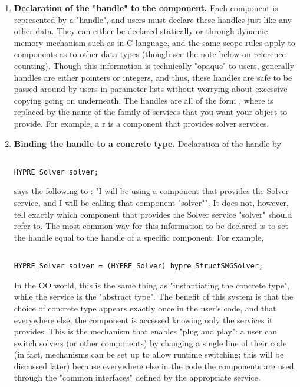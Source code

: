 \begin{enumerate}
\begin{enumerate}
\item
{\bf Declaration of the "handle" to the component.}  Each \hypre{} component is
represented by a 
"handle", and users must declare these handles just like any other data. They
can either be declared
statically or through dynamic memory mechanism such as  in C language,
and the same 
scope rules apply to \hypre{} components as to other data types (though see the
note below on 
reference counting). Though this information is technically "opaque" to users,
generally \hypre{} 
handles are either pointers or integers, and thus, these handles are safe to be
passed around by users in 
parameter lists without worrying about excessive copying going on underneath. 
The handles are all of the form
, where 
 is replaced by the name of the family of services that you want your
\hypre{} object to 
provide. For example, a r is a component that provides solver
services.

\item
{\bf Binding the handle to a concrete type.} Declaration of the handle by

\begin{display}
\begin{verbatim}

HYPRE_Solver solver; 

\end{verbatim}
\end{display}

says the 
following to \hypre{}: "I will be using a \hypre{} component that provides the Solver
service, and I will 
be calling that component "solver"". It does not, however, tell \hypre{} exactly
which component that 
provides the Solver service "solver" should refer to. The most common way for
this information to be 
declared is to set the handle equal to the handle of a specific component. For
example, 

\begin{display}
\begin{verbatim}

HYPRE_Solver solver = (HYPRE_Solver) hypre_StructSMGSolver;

\end{verbatim}
\end{display}

In the OO world, this is the
same thing as 
"instantiating the concrete type", while the service is the "abstract
type". The benefit of this 
system is that the choice of concrete type appears exactly once in the user's
code, and that everywhere 
else, the component is accessed knowing only the services it provides. This is
the mechanism that 
enables "plug and play": a user can switch solvers (or other components) by
changing a single line of 
their code (in fact, mechanisms can be set up to allow runtime switching; this
will be discussed later) 
because everywhere else in the code the components are used through the "common
interfaces" 
defined by the appropriate \hypre{} service.


\end{enumerate}
\end{enumerate}
